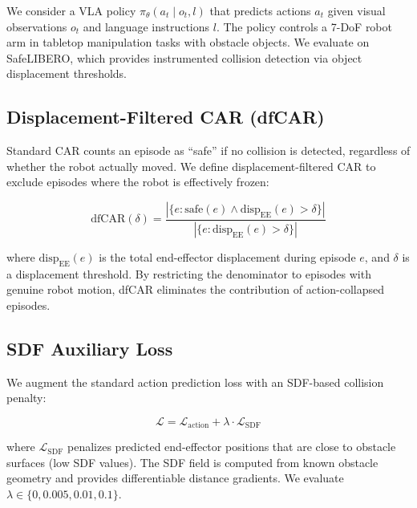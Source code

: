 \documentclass[letterpaper]{article}
\begin{document}
We consider a VLA policy $\pi_\theta(a_t \mid o_t, l)$ that predicts actions $a_t$ given visual observations $o_t$ and language instructions $l$. The policy controls a 7-DoF robot arm in tabletop manipulation tasks with obstacle objects. We evaluate on SafeLIBERO, which provides instrumented collision detection via object displacement thresholds.

\subsection{Displacement-Filtered CAR (dfCAR)}
\label{sec:dfcar-method}

Standard CAR counts an episode as ``safe'' if no collision is detected, regardless of whether the robot actually moved. We define displacement-filtered CAR to exclude episodes where the robot is effectively frozen:

\begin{equation}
\text{dfCAR}(\delta) = \frac{|\{e : \text{safe}(e) \wedge \text{disp}_{\text{EE}}(e) > \delta\}|}{|\{e : \text{disp}_{\text{EE}}(e) > \delta\}|}
\label{eq:dfcar}
\end{equation}

where $\text{disp}_{\text{EE}}(e)$ is the total end-effector displacement during episode $e$, and $\delta$ is a displacement threshold. By restricting the denominator to episodes with genuine robot motion, dfCAR eliminates the contribution of action-collapsed episodes.

\subsection{SDF Auxiliary Loss}
\label{sec:sdf-loss}

We augment the standard action prediction loss with an SDF-based collision penalty:

\begin{equation}
\mathcal{L} = \mathcal{L}_{\text{action}} + \lambda \cdot \mathcal{L}_{\text{SDF}}
\label{eq:total-loss}
\end{equation}

where $\mathcal{L}_{\text{SDF}}$ penalizes predicted end-effector positions that are close to obstacle surfaces (low SDF values). The SDF field is computed from known obstacle geometry and provides differentiable distance gradients. We evaluate $\lambda \in \{0, 0.005, 0.01, 0.1\}$.
\end{document}
